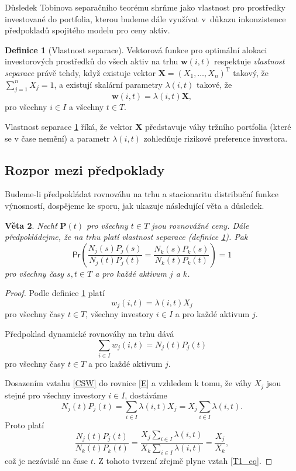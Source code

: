 \documentclass[a4paper,12pt]{report}
\newtheorem{veta}{Věta}
\theoremstyle{definition} \newtheorem{definice}[veta]{Definice}
\theoremstyle{remark}
\begin{document}
Důsledek Tobinova separačního teorému shrňme jako vlastnost pro prostředky investované do portfolia, kterou budeme dále využívat v~důkazu inkonzistence předpokladů spojitého modelu pro ceny aktiv.
\begin{definice}[Vlastnost separace]\label{vlastnost_separace}
Vektorová funkce pro optimální alokaci investorových prostředků do všech aktiv na trhu $\boldsymbol{w}(i,t)$ respektuje \textit{vlastnost separace} právě tehdy, když existuje vektor $\boldsymbol{X}=(X_1,\dots,X_n)^\mathrm{T}$ takový, že $\sum_{j=1}^nX_j=1$, a existují skalární parametry $\lambda(i,t)$ takové, že
$$\boldsymbol{w}(i,t)=\lambda(i,t)\boldsymbol{X},$$
pro všechny $i\in I$ a všechny $t\in T$.
\end{definice}
Vlastnost separace \ref{vlastnost_separace} říká, že vektor $\boldsymbol{X}$ představuje váhy tržního portfolia (které se v čase nemění) a parametr $\lambda(i,t)$ zohledňuje rizikové preference investora.

\subsection{Rozpor mezi předpoklady}
Budeme-li předpokládat rovnováhu na trhu a stacionaritu distribuční funkce výnosností, dospějeme ke sporu, jak ukazuje následující věta a důsledek.

\begin{veta} \label{T1}
Nechť $\boldsymbol{P}(t)$ pro všechny $t\in T$  jsou rovnovážné ceny.
Dále předpokládejme, že na trhu platí vlastnost separace (definice \ref{vlastnost_separace}).
Pak
\begin{equation}\label{T1_eq}
\mathsf{Pr}\left(\frac{N_j(s)P_j(s)}{N_j(t)P_j(t)}=\frac{N_k(s)P_k(s)}{N_k(t)P_k(t)}\right)=1
\end{equation}
pro všechny časy $s,t\in T$  a pro každé aktivum $j$ a $k$.
\end{veta}

\begin{proof}
Podle definice \ref{vlastnost_separace} platí
\begin{equation}\label{CSW}
w_j(i,t)=\lambda(i,t)X_j
\end{equation}
pro všechny časy $t\in T$, všechny investory $i\in I$ a pro každé aktivum $j$.

Předpoklad dynamické rovnováhy na trhu dává
\begin{equation}\label{E}
\sum_{i\in I} w_{j}(i,t)=N_j(t)P_j(t)
\end{equation}
pro všechny časy $t\in T$ a pro každé aktivum $j$.

Dosazením vztahu \eqref{CSW} do rovnice \eqref{E} a vzhledem k tomu, že váhy $X_j$ jsou stejné pro všechny investory $i\in I$, dostáváme
$$N_j(t)P_j(t)=\sum_{i\in I}\lambda(i,t)X_j=X_j\sum_{i\in I}\lambda(i,t).$$
Proto platí
$$\frac{N_j(t)P_j(t)}{N_k(t)P_k(t)}=\frac{X_j\sum_{i\in I}\lambda(i,t)}{X_k\sum_{i\in I}\lambda(i,t)}=\frac{X_j}{X_k},$$
což je nezávislé na čase $t$.         
Z tohoto tvrzení zřejmě plyne vztah \eqref{T1_eq}.
\end{proof}
\end{document}
